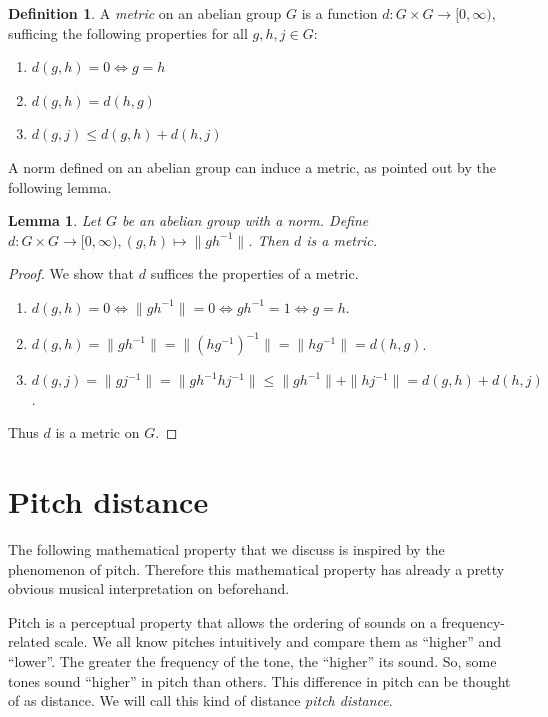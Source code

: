 \documentclass[a4paper]{book}
\newtheorem{lemma}[theorem]{Lemma}
\theoremstyle{definition}
\newtheorem{definition}[theorem]{Definition}
\begin{document}
\begin{definition}
	A \emph{metric} on an abelian group $G$ is a function $d:G \times G \to [0,\infty)$, sufficing the following properties for all $g,h,j \in G$:
	\begin{enumerate}[i]
		\item $d(g,h) = 0 \Leftrightarrow g=h$
		\item $d(g,h) = d(h,g)$
		\item $d(g,j) \leq d(g,h) + d(h,j)$
	\end{enumerate}
\end{definition}

A norm defined on an abelian group can induce a metric, as pointed out by the following lemma.

\begin{lemma}
    Let $G$ be an abelian group with a norm.
    Define $d:G \times G \to [0,\infty), (g,h) \mapsto \|gh^{-1}\|$.
    Then $d$ is a metric.
	\label{norm_to_metric}
\end{lemma}
\begin{proof}
	We show that $d$ suffices the properties of a metric.
    \begin{enumerate}[i]
        \item $d(g,h) = 0 \Leftrightarrow \|gh^{-1}\| = 0 \Leftrightarrow gh^{-1} = 1 \Leftrightarrow g = h$.
        \item $d(g,h) = \|gh^{-1}\| = \|(hg^{-1})^{-1}\| = \|hg^{-1}\| = d(h,g)$.
        \item $d(g,j) = \|gj^{-1}\| = \|gh^{-1}hj^{-1}\| \leq \|gh^{-1}\|+ \|hj^{-1}\| = d(g,h) + d(h,j)$.
    \end{enumerate}
	Thus $d$ is a metric on $G$.
\end{proof}

\section{Pitch distance}
The following mathematical property that we discuss is inspired by the phenomenon of pitch.
Therefore this mathematical property has already a pretty obvious musical interpretation on beforehand.

Pitch is a perceptual property that allows the ordering of sounds on a frequency-related scale.
We all know pitches intuitively and compare them as ``higher'' and ``lower''.
The greater the frequency of the tone, the ``higher'' its sound.
So, some tones sound ``higher'' in pitch than others.
This difference in pitch can be thought of as distance.
We will call this kind of distance \emph{pitch distance}.
\end{document}
